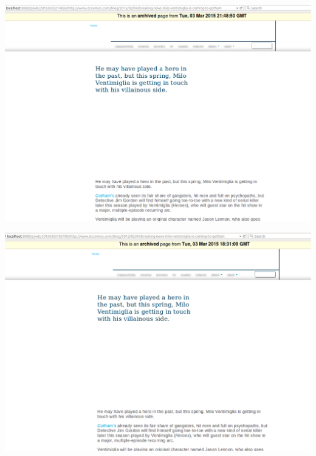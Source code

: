 \begin{minipage}{\linewidth}
	\includegraphics[scale=0.55]{figures/playback/pywb_24_webrecorder.PNG}
	\label{sizeURI3}
\end{minipage}
\newpage
\begin{minipage}{\linewidth}
	\includegraphics[scale=0.55]{figures/playback/pywb_24_wget.PNG}
	\label{sizeURI3}
\end{minipage}
\newpage
